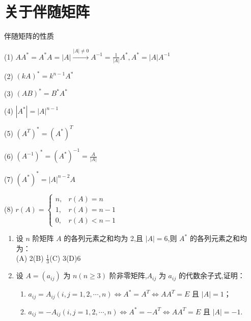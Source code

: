\documentclass[12pt, a4paper, oneside, UTF8]{ctexbook}
\begin{document}
\section{关于伴随矩阵}
\begin{remark}
    伴随矩阵的性质
    \item[(1)] $AA^*=A^*A=\left|A\right|\xrightarrow{|A|\neq 0}A^{-1}=\frac{1}{|A|}A^*,A^*=|A|A^{-1}$
    \item[(2)] $(kA)^*=k^{n-1}A^*$
    \item[(3)] $(AB)^*=B^*A^*$
    \item[(4)] $|A^*|=\left|A\right|^{n-1}$
    \item[(5)] $(A^T)^*=(A^*)^T$
    \item[(6)] $(A^{-1})^*=(A^*)^{-1}=\frac{A}{\left|A\right|}$
    \item[(7)] $(A^*)^*=\left|A\right|^{n-2}A$
    \item[(8)] 
    $r(A)=
    \begin{cases}
        n,& r(A)=n\\
        1,& r(A)=n-1\\
        0,& r(A)<n-1
    \end{cases}
    $       
\end{remark}
\begin{enumerate}[label=\arabic*.,start=9]
    \item 设 $ n $ 阶矩阵 $ A $ 的各列元素之和均为 2,且 $ |A| = 6 $,则 $ A^* $ 的各列元素之和均为：\\
    (A) 2\qquad (B) $\frac{1}{3}$\qquad (C) 3\qquad (D)6
    
    \begin{solution}
    \newpage
    \end{solution}
    
    \item 设 $ A = (a_{ij}) $ 为 $ n(n \geq 3) $ 阶非零矩阵,$ A_{ij} $ 为 $ a_{ij} $ 的代数余子式,证明：
    \begin{enumerate}
        \item $ a_{ij} = A_{ij}(i, j = 1, 2, \cdots, n) \Leftrightarrow A^* = A^T \Leftrightarrow AA^T = E $ 且 $ |A| = 1 $；
        \item $ a_{ij} = -A_{ij}(i, j = 1, 2, \cdots, n) \Leftrightarrow A^* = -A^T \Leftrightarrow AA^T = E $ 且 $ |A| = -1 $.
    \end{enumerate}
    
    \begin{solution}
    \newpage
    \end{solution}
\end{enumerate}
\end{document}
